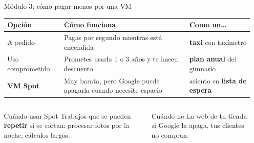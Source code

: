 \documentclass[aspectratio=169,10pt,c]{beamer}
\begin{document}
\begin{frame}{Módulo 3: cómo pagar menos por una VM}
\renewcommand{\arraystretch}{1.35}
\centering\small
\begin{tabular}{@{}p{3.4cm}p{5.2cm}p{4.0cm}@{}}
\toprule
\textbf{Opción} & \textbf{Cómo funciona} & \textbf{Como un\ldots}\\
\midrule
A pedido & Pagas por segundo mientras está encendida & \textbf{taxi} con taxímetro\\
Uso comprometido & Prometes usarla 1 o 3 años y te hacen descuento & \textbf{plan anual} del gimnasio\\
\textbf{VM Spot} & Muy barata, pero Google puede apagarla cuando necesite espacio & asiento en \textbf{lista de espera}\\
\bottomrule
\end{tabular}
\par\vspace{4mm}
\begin{columns}[T,onlytextwidth]
\begin{exampleblock}{Cuándo usar Spot}
\small Trabajos que se pueden \textbf{repetir} si se cortan: procesar fotos por la noche, cálculos largos.
\end{exampleblock}
\begin{alertblock}{Cuándo no}
\small La web de tu tienda: si Google la apaga, tus clientes no compran.
\end{alertblock}
\end{columns}
\end{frame}
\end{document}
